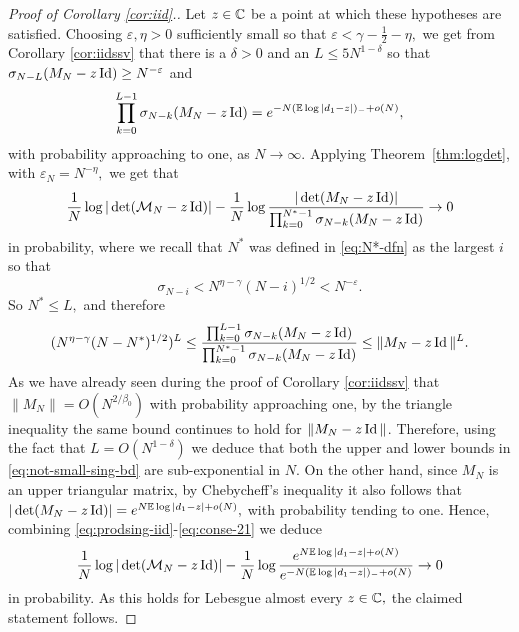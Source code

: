 \documentclass{amsart}
\numberwithin{equation}{section}
\def\corAB{}
\begin{document}
\begin{proof}[Proof of Corollary \ref{cor:iid}.]
    Let $z \in \mathbb{C}$ be a point at which these hypotheses are satisfied.
    Choosing \corAB{$\varepsilon, \eta > 0$ sufficiently small so that} %
 $ \varepsilon < \gamma - \tfrac{1}{2}-\eta,$ we get from Corollary \ref{cor:iidssv} that there is a $\delta > 0$ and an $\corAB{L \leq 5 N^{1-\delta}}$ so that $\sigma_{N-\corAB{L}}(M_N-z\Id) \geq N^{-\varepsilon}$ and
    \begin{equation}\label{eq:prodsing-iid}
      \prod_{k=0}^{\corAB{L}-1} \sigma_{N-k}(M_N-z \Id) = e^{-N(\Exp\log|d_1-z|)_{-} + o(N)},
    \end{equation}
    \corAB{with probability approaching to one, as $N \to \infty$.} Applying Theorem~\ref{thm:logdet}, with $\varepsilon_N = N^{-\eta},$ we get that
    \begin{equation}\label{eq:conse-21}
      \frac{1}{N}\log|\det(\mathcal{M}_N-z\operatorname{Id})|
      -
      \frac{1}{N}\log\frac{|\det(M_N-z\operatorname{Id})|}{ \prod_{k=0}^{N^{*}-1} \sigma_{N-k}(M_N-z \operatorname{Id})} \to 0
    \end{equation}
    in probability,
    where we recall that $N^*$ was defined in \eqref{eq:N*-dfn} as the largest $i$ so that
    \[
      \sigma_{N-i} < N^{\eta - \gamma}(N-i)^{1/2} < N^{-\varepsilon}.
    \]
    So $N^* \leq \corAB{L},$ and therefore
    \begin{equation}\label{eq:not-small-sing-bd}
      (N^{\eta-\gamma}(N-N^*)^{1/2})^{\corAB{L}}
      \leq
      \frac
      {\prod_{k=0}^{\corAB{L}-1} \sigma_{N-k}(M_N-z \Id)}
      {\prod_{k=0}^{N^{*}-1} \sigma_{N-k}(M_N-z \Id)}
      \leq
      \|M_N - z\Id\|^{\corAB{L}}.
    \end{equation}
    \corAB{As we have already seen during the proof of Corollary \ref{cor:iidssv} that $\|M_N\| = O(N^{2/\beta_0})$ with probability approaching one, by the triangle inequality the same bound continues to hold for $\|M_N -z \operatorname{Id}\|$. Therefore, using the fact that $L=O(N^{1-\delta})$ we deduce that both the upper and lower bounds in \eqref{eq:not-small-sing-bd} are sub-exponential in $N$. On the other hand, since $M_N$ is an upper triangular matrix, by Chebycheff's inequality it also follows that $|\det(M_N-z\operatorname{Id})|=e^{N\mathbb{E}\log|d_1-z| + o(N)},$ with probability tending to one. Hence, combining \eqref{eq:prodsing-iid}-\eqref{eq:conse-21} we deduce}
%
    \[
      \frac{1}{N}\log|\det(\mathcal{M}_N-z\operatorname{Id})|
      -
      \frac{1}{N}\log\frac{e^{N\mathbb{E}\log|d_1-z| + o(N)}}{e^{-N(\mathbb{E}\log|d_1-z|)_{-} + o(N)}} \to 0
    \]
    in probability.  As this holds for Lebesgue almost every $z \in \mathbb{C},$ the claimed statement follows.
  \end{proof}
\end{document}
